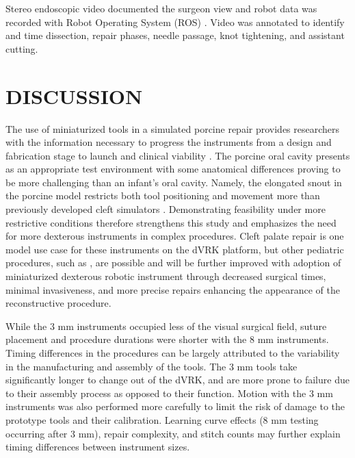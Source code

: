

Stereo endoscopic video documented the surgeon view and robot data was recorded with Robot Operating System (ROS) \cite{quigley2009ros}. Video was annotated to identify and time dissection, repair phases, needle passage, knot tightening, and assistant cutting.





\section*{DISCUSSION}
\noindent  {}

The use of miniaturized tools in a simulated porcine repair provides researchers with the information necessary to progress the instruments from a design and fabrication stage to launch and clinical viability \cite{nasa2016systems}. The porcine oral cavity presents as an appropriate test environment with some anatomical differences proving to be more challenging than an infant's oral cavity. Namely, the elongated snout in the porcine model restricts both tool positioning and movement more than previously developed cleft simulators \cite{podolsky2017simulator}. Demonstrating feasibility under more restrictive conditions therefore strengthens this study and emphasizes the need for more dexterous instruments in complex procedures. Cleft palate repair is one model use case for these instruments on the dVRK platform, but other pediatric procedures, such as , are possible and will be further improved with adoption of miniaturized dexterous robotic instrument through decreased surgical times, minimal invasiveness, and more precise repairs enhancing the appearance of the reconstructive procedure. 

While the 3 mm instruments occupied less of the visual surgical field, suture placement and procedure durations were shorter with the 8 mm instruments. Timing differences in the procedures can be largely attributed to the variability in the manufacturing and assembly of the tools. The 3 mm tools take significantly longer to change out of the dVRK, and are more prone to failure due to their assembly process as opposed to their function. Motion with the 3 mm instruments was also performed more carefully to limit the risk of damage to the prototype tools and their calibration. Learning curve effects (8 mm testing occurring after 3 mm), repair complexity, and stitch counts may further explain timing differences between instrument sizes. 

